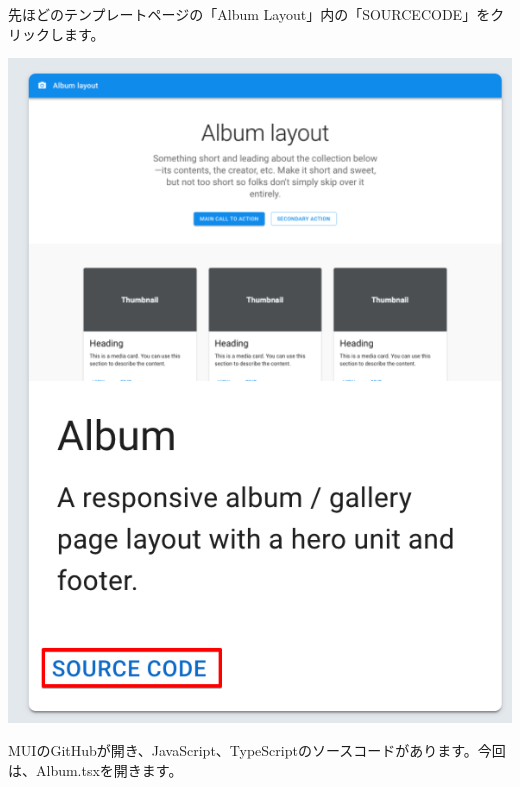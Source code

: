 先ほどのテンプレートページの「Album Layout」内の「SOURCECODE」をクリックします。


\clearpage

\begin{reviewimage}%
\includegraphics[width=0.4\maxwidth]{./images/03-todo-with-react/mui006-albumLayoutSource.png}%
\label{image:03-todo-with-react:mui006-albumLayoutSource}
\end{reviewimage}

MUIのGitHubが開き、JavaScript、TypeScriptのソースコードがあります。今回は、Album.tsxを開きます。

